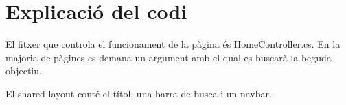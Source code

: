 \section{Explicaci\'o del codi}
El fitxer que controla el funcionament de la p\`agina \'es HomeController.cs. 
En la majoria de p\`agines es demana un argument amb el qual es buscar\`a
la beguda objectiu.

El shared layout cont\'e el t\'itol, una barra de busca i un navbar.
